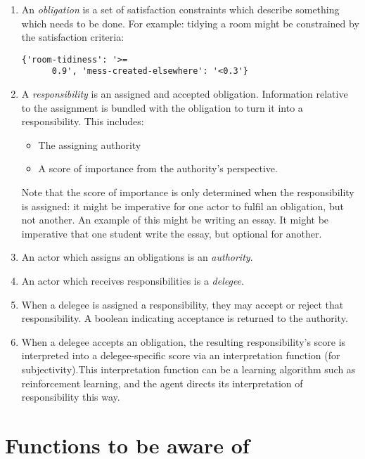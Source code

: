 \documentclass{article}
\begin{document}
\begin{enumerate}
\item An \emph{obligation} is a set of satisfaction constraints which describe something which needs to be done.\newline
  For example: tidying a room might be constrained by the satisfaction criteria: \begin{verbatim}{'room-tidiness': '>=
      0.9', 'mess-created-elsewhere': '<0.3'}\end{verbatim}

\item A \emph{responsibility} is an assigned and accepted obligation. Information relative to the assignment is bundled
  with the obligation to turn it into a responsibility. This includes:
         \begin{itemize}
             \item The assigning authority
             \item A score of importance from the authority's perspective.
         \end{itemize}

         Note that the score of importance is only determined when the responsibility is assigned: it might be
         imperative for one actor to fulfil an obligation, but not another. An example of this might be writing an
         essay. It might be imperative that one student write the essay, but optional for another.

         \item An actor which assigns an obligations is an \emph{authority}.
         \item An actor which receives responsibilities is a \emph{delegee}.
         \item When a delegee is assigned a responsibility, they may accept or reject that responsibility. A boolean
           indicating acceptance is returned to the authority.
         \item When a delegee accepts an obligation, the resulting responsibility's score is interpreted into a
           delegee-specific score via an interpretation function (for subjectivity).\newline This interpretation
           function can be a learning algorithm such as reinforcement learning, and the agent directs its interpretation
           of responsibility this way.
\end{enumerate}

\bigskip

\section{Functions to be aware of}
\end{document}
